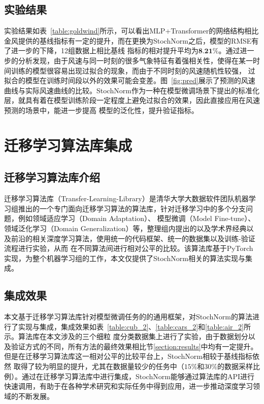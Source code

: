 \subsection{实验结果}

实验结果如表~\ref{table:goldwind}所示，可以看出MLP+Transformer的网络结构相比金风提供的基线指标有一定的提升，而在更换为StochNorm之后，模型的RMSE有了进一步的下降，12组数据上相比基线
指标的相对提升平均为$\textbf{8.21\%}$。通过进一步的分析发现，由于风速与同一时刻的很多气象特征有着强相关性，使得在某一时间训练的模型很容易出现过拟合的现象，而由于不同时刻的风速随机性较强，
过拟合的模型在训练时间段以外的效果可能会变差。图~\ref{fig:pred}展示了预测的风速曲线与实际风速曲线的比较。StochNorm作为一种在模型微调场景下提出的标准化层，就具有着在模型训练阶段一定程度上避免过拟合的效果，因此直接应用在风速预测的场景中，能进一步提高
模型的泛化性，提升验证指标。




\section{迁移学习算法库集成}

\subsection{迁移学习算法库介绍}

迁移学习算法库（Transfer-Learning-Library）是清华大学大数据软件团队机器学习组推出的一个专门面向迁移学习算法的算法库，针对迁移学习中的多个分支问题，例如领域适应学习（Domain Adaptation）、
模型微调（Model Fine-tune）、领域泛化学习（Domain Generalization）等，整理组内提出的以及学术界经典以及前沿的相关深度学习算法，使用统一的代码框架、统一的数据集以及训练-验证流程进行实验，从而
在不同算法间进行相对公平的比较。该算法库基于PyTorch实现，为整个机器学习组的工作，本文仅提供了StochNorm相关的算法实现与集成。

\subsection{集成效果}

本文基于迁移学习算法库针对模型微调任务的的通用框架，对StochNorm的算法进行了实现与集成，集成效果如表~\ref{table:cub_2}、\ref{table:cars_2}和\ref{table:air_2}所示。算法库在本文涉及的三个细粒
度分类数据集上进行了实验，由于数据划分以及验证方式的不同，所有方法的最终效果相比节\ref{section:results}中均有一定提升。但是在迁移学习算法库这一相对公平的比较平台上，StochNorm相较于基线指标依然
取得了较为明显的提升，尤其在数据量较少的任务中（$15\%$和$30\%$的数据采样比例）。通过在迁移学习算法库中进行集成，StochNorm能够通过算法库的API进行快速调用，有助于在各种学术研究和实际任务中得到应用，进一步推动深度学习领域的不断发展。


